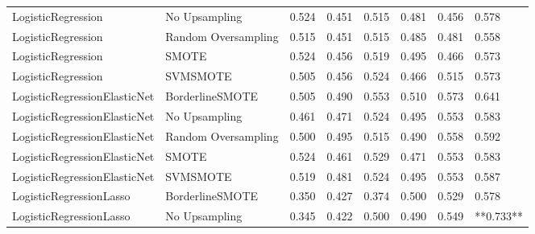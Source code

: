 \begin{tabular}{llllllll}
          LogisticRegression &       No Upsampling &     0.524 &                     0.451 &                 0.515 &                  0.481 &                                   0.456 &     0.578 \\
          LogisticRegression & Random Oversampling &     0.515 &                     0.451 &                 0.515 &                  0.485 &                                   0.481 &     0.558 \\
          LogisticRegression &               SMOTE &     0.524 &                     0.456 &                 0.519 &                  0.495 &                                   0.466 &     0.573 \\
          LogisticRegression &            SVMSMOTE &     0.505 &                     0.456 &                 0.524 &                  0.466 &                                   0.515 &     0.573 \\
LogisticRegressionElasticNet &     BorderlineSMOTE &     0.505 &                     0.490 &                 0.553 &                  0.510 &                                   0.573 &     0.641 \\
LogisticRegressionElasticNet &       No Upsampling &     0.461 &                     0.471 &                 0.524 &                  0.495 &                                   0.553 &     0.583 \\
LogisticRegressionElasticNet & Random Oversampling &     0.500 &                     0.495 &                 0.515 &                  0.490 &                                   0.558 &     0.592 \\
LogisticRegressionElasticNet &               SMOTE &     0.524 &                     0.461 &                 0.529 &                  0.471 &                                   0.553 &     0.583 \\
LogisticRegressionElasticNet &            SVMSMOTE &     0.519 &                     0.481 &                 0.524 &                  0.495 &                                   0.553 &     0.587 \\
     LogisticRegressionLasso &     BorderlineSMOTE &     0.350 &                     0.427 &                 0.374 &                  0.500 &                                   0.529 &     0.578 \\
     LogisticRegressionLasso &       No Upsampling &     0.345 &                     0.422 &                 0.500 &                  0.490 &                                   0.549 & **0.733** \\

\end{tabular}
